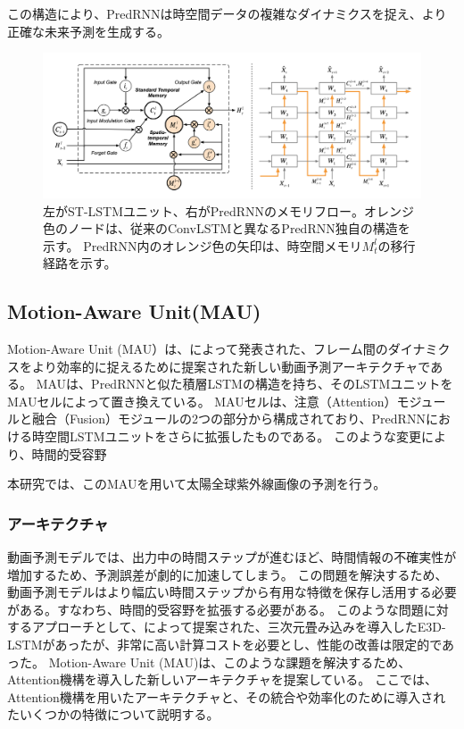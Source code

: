           この構造により、PredRNNは時空間データの複雑なダイナミクスを捉え、より正確な未来予測を生成する。
          \begin{figure}[htbp]
            \begin{center}
              \includegraphics[width=160mm]{figures/videoprediction/predrnn_unit.png}
              \caption{左がST-LSTMユニット、右がPredRNNのメモリフロー。オレンジ色のノードは、従来のConvLSTMと異なるPredRNN独自の構造を示す。
              PredRNN内のオレンジ色の矢印は、時空間メモリ\( M_t^l \)の移行経路を示す。}
              \label{fig:stlstm}
            \end{center}
          \end{figure}
        
    \subsection{Motion-Aware Unit(MAU)}
      Motion-Aware Unit (MAU）は、によって発表された、フレーム間のダイナミクスをより効率的に捉えるために提案された新しい動画予測アーキテクチャである。
      MAUは、PredRNNと似た積層LSTMの構造を持ち、そのLSTMユニットをMAUセルによって置き換えている。
      MAUセルは、注意（Attention）モジュールと融合（Fusion）モジュールの2つの部分から構成されており、PredRNNにおける時空間LSTMユニットをさらに拡張したものである。
      このような変更により、時間的受容野

      本研究では、このMAUを用いて太陽全球紫外線画像の予測を行う。
      
      \subsubsection{アーキテクチャ}
      動画予測モデルでは、出力中の時間ステップが進むほど、時間情報の不確実性が増加するため、予測誤差が劇的に加速してしまう。
      この問題を解決するため、動画予測モデルはより幅広い時間ステップから有用な特徴を保存し活用する必要がある。すなわち、時間的受容野を拡張する必要がある。
      このような問題に対するアプローチとして、によって提案された、三次元畳み込みを導入したE3D-LSTMがあったが、非常に高い計算コストを必要とし、性能の改善は限定的であった。
      Motion-Aware Unit (MAU)は、このような課題を解決するため、Attention機構を導入した新しいアーキテクチャを提案している。
      ここでは、Attention機構を用いたアーキテクチャと、その統合や効率化のために導入されたいくつかの特徴について説明する。
      
